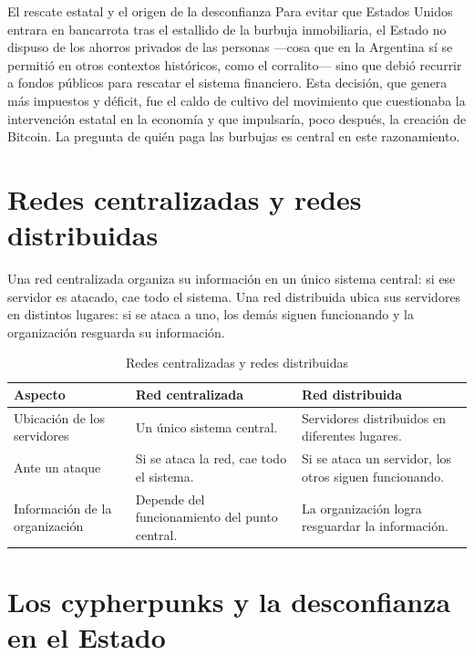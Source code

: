 \documentclass[12pt,oneside]{book}
\begin{document}
\begin{example}{El rescate estatal y el origen de la desconfianza}
Para evitar que Estados Unidos entrara en bancarrota tras el estallido de la burbuja inmobiliaria, el Estado no dispuso de los ahorros privados de las personas ---cosa que en la Argentina sí se permitió en otros contextos históricos, como el corralito--- sino que debió recurrir a fondos públicos para rescatar el sistema financiero. Esta decisión, que genera más impuestos y déficit, fue el caldo de cultivo del movimiento que cuestionaba la intervención estatal en la economía y que impulsaría, poco después, la creación de Bitcoin. La pregunta de quién paga las burbujas es central en este razonamiento.
\end{example}

\section{Redes centralizadas y redes distribuidas}
\label{sec:redes}

Una red centralizada organiza su información en un único sistema central: si ese servidor es atacado, cae todo el sistema. Una red distribuida ubica sus servidores en distintos lugares: si se ataca a uno, los demás siguen funcionando y la organización resguarda su información.

\begin{table}[H]
\centering
\caption{Redes centralizadas y redes distribuidas}
\renewcommand{\arraystretch}{1.2}
\begin{tabularx}{\textwidth}{>{\raggedright\arraybackslash}p{}XX}
\toprule
\textbf{Aspecto} & \textbf{Red centralizada} & \textbf{Red distribuida} \\
\midrule
Ubicación de los servidores & Un único sistema central. & Servidores distribuidos en diferentes lugares. \\
Ante un ataque & Si se ataca la red, cae todo el sistema. & Si se ataca un servidor, los otros siguen funcionando. \\
Información de la organización & Depende del funcionamiento del punto central. & La organización logra resguardar la información. \\
\bottomrule
\end{tabularx}
\end{table}

\section{Los cypherpunks y la desconfianza en el Estado}
\end{document}

